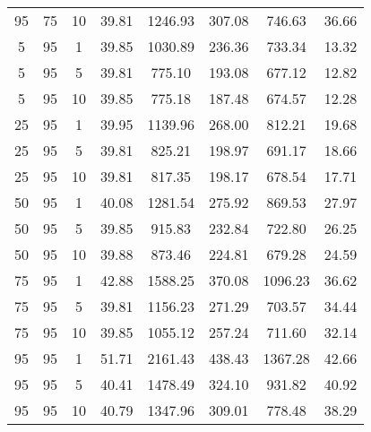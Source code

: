 \begin{table}[h]
\begin{tabular}{ccc|c|c|c|c|c}
95 & 75 & 10 & \cellcolor{gray!50}39.81 & \cellcolor{gray!1}1246.93 & \cellcolor{gray!1}307.08 & \cellcolor{gray!24}746.63 & 36.66\\
5 & 95 & 1 & \cellcolor{gray!50}39.85 & \cellcolor{gray!1}1030.89 & \cellcolor{gray!1}236.36 & \cellcolor{gray!28}733.34 & 13.32\\
5 & 95 & 5 & \cellcolor{gray!50}39.81 & \cellcolor{gray!42}775.10 & \cellcolor{gray!35}193.08 & \cellcolor{gray!45}677.12 & 12.82\\
5 & 95 & 10 & \cellcolor{gray!50}39.85 & \cellcolor{gray!42}775.18 & \cellcolor{gray!40}187.48 & \cellcolor{gray!46}674.57 & 12.28\\
25 & 95 & 1 & \cellcolor{gray!49}39.95 & \cellcolor{gray!1}1139.96 & \cellcolor{gray!1}268.00 & \cellcolor{gray!4}812.21 & 19.68\\
25 & 95 & 5 & \cellcolor{gray!50}39.81 & \cellcolor{gray!34}825.21 & \cellcolor{gray!30}198.97 & \cellcolor{gray!41}691.17 & 18.66\\
25 & 95 & 10 & \cellcolor{gray!50}39.81 & \cellcolor{gray!35}817.35 & \cellcolor{gray!30}198.17 & \cellcolor{gray!45}678.54 & 17.71\\
50 & 95 & 1 & \cellcolor{gray!48}40.08 & \cellcolor{gray!1}1281.54 & \cellcolor{gray!1}275.92 & \cellcolor{gray!1}869.53 & 27.97\\
50 & 95 & 5 & \cellcolor{gray!50}39.85 & \cellcolor{gray!19}915.83 & \cellcolor{gray!1}232.84 & \cellcolor{gray!31}722.80 & 26.25\\
50 & 95 & 10 & \cellcolor{gray!50}39.88 & \cellcolor{gray!26}873.46 & \cellcolor{gray!6}224.81 & \cellcolor{gray!45}679.28 & 24.59\\
75 & 95 & 1 & \cellcolor{gray!19}42.88 & \cellcolor{gray!1}1588.25 & \cellcolor{gray!1}370.08 & \cellcolor{gray!1}1096.23 & 36.62\\
75 & 95 & 5 & \cellcolor{gray!50}39.81 & \cellcolor{gray!1}1156.23 & \cellcolor{gray!1}271.29 & \cellcolor{gray!37}703.57 & 34.44\\
75 & 95 & 10 & \cellcolor{gray!50}39.85 & \cellcolor{gray!1}1055.12 & \cellcolor{gray!1}257.24 & \cellcolor{gray!35}711.60 & 32.14\\
95 & 95 & 1 & \cellcolor{gray!1}51.71 & \cellcolor{gray!1}2161.43 & \cellcolor{gray!1}438.43 & \cellcolor{gray!1}1367.28 & 42.66\\
95 & 95 & 5 & \cellcolor{gray!44}40.41 & \cellcolor{gray!1}1478.49 & \cellcolor{gray!1}324.10 & \cellcolor{gray!1}931.82 & 40.92\\
95 & 95 & 10 & \cellcolor{gray!41}40.79 & \cellcolor{gray!1}1347.96 & \cellcolor{gray!1}309.01 & \cellcolor{gray!14}778.48 & 38.29

\end{tabular}
\end{table}
